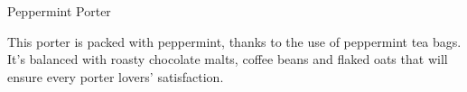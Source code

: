 \begin{recipie}{Peppermint Porter}

\begin{aboutblock}
This porter is packed with peppermint, thanks to the use of peppermint tea bags.
It's balanced with roasty chocolate malts, coffee beans and flaked oats that
will ensure every porter lovers' satisfaction. 
\end{aboutblock}


\begin{methodandtiming}
 
\begin{mashsteps}
\end{mashsteps}

\begin{fermentationsteps}
\end{fermentationsteps}

\end{methodandtiming}

\pagebreak

\begin{ingredientsblock}

\begin{malts}
\end{malts}

\begin{hops}

\end{hops}


\begin{twists}
\end{twists}

\end{ingredientsblock}

\end{recipie}